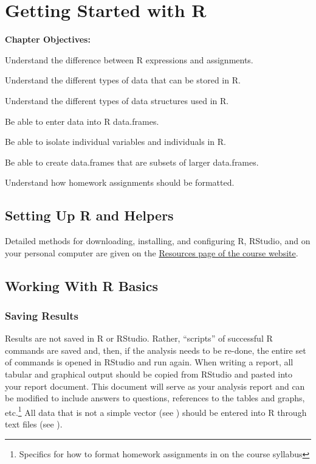 \documentclass[10pt,openany]{book}\usepackage[]{graphicx}\usepackage[]{color}
\begin{document}
\chapter{Getting Started with R} \label{chap:FoundationsR}
\begin{ChapObj}{\boxwidth}
  \textbf{Chapter Objectives:}
  \begin{Enumerate}
    \item Understand the difference between R expressions and assignments.
    \item Understand the different types of data that can be stored in R.
    \item Understand the different types of data structures used in R.
    \item Be able to enter data into R data.frames.
    \item Be able to isolate individual variables and individuals in R.
    \item Be able to create data.frames that are subsets of larger data.frames.
    \item Understand how homework assignments should be formatted.
  \end{Enumerate}
\end{ChapObj}

\minitoc
\newpage

\section{Setting Up R and Helpers} \label{sect:RSetup}
\vspace{-8pt}
Detailed methods for downloading, installing, and configuring R, RStudio, and  on your personal computer are given on the \href{http://derekogle.com/NCMTH107/resources/}{Resources page of the course website}.

\vspace{-8pt}
\section{Working With R Basics} \label{sect:RBasics}
\vspace{-12pt}
\subsection{Saving Results} \label{sect:RSaving}
Results are not saved in R or RStudio.  Rather, ``scripts'' of successful R commands are saved and, then, if the analysis needs to be re-done, the entire set of commands is opened in RStudio and run again.  When writing a report, all tabular and graphical output should be copied from RStudio and pasted into your report document.  This document will serve as your analysis report and can be modified to include answers to questions, references to the tables and graphs, etc.\footnote{Specifics for how to format homework assignments in on the course syllabus}  All data that is not a simple vector (see ) should be entered into R through text files (see ).
\end{document}
